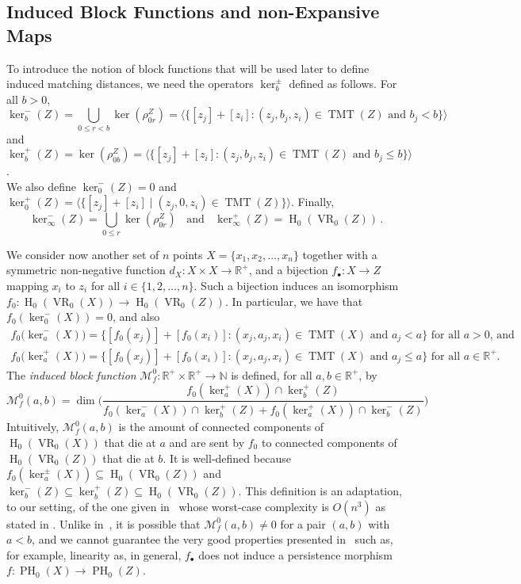 \documentclass{article}
\DeclareMathOperator{\PH}{PH}
\DeclareMathOperator{\VR}{VR}
\DeclareMathOperator{\Ho}{H}
\DeclareMathOperator{\TMT}{TMT}
\newcommand{\R}{\mathbb{R}^+}
\newcommand{\N}{\mathbb{N}}
\newcommand{\cM}{\mathcal{M}}
\newcommand{\scst}{\scriptscriptstyle}
\newcommand{\cMXZ}{\cM_f^0}
\newcommand{\dX}{d_{\scst X}}
\newcommand{\dZ}{d_{\scst Z}}
\newcommand{\fbullet}{f_{\bullet}}
\begin{document}
\subsection{Induced Block Functions
and non-Expansive Maps}\label{sec:non-expansive}

To introduce  the notion of block functions that will be used later to define induced matching distances, we need the 
 operators $\ker^\pm_{b}$  defined as follows. For all $b>0$,
\[\ker^-_b(Z
)= \bigcup_{0 \leq r < b} \ker(\rho^{\scst Z}_{0r})
=\big\langle
\big\{[z_j]+[z_i]\colon (z_j, b_j, z_i)\in \TMT(Z)\mbox{ and }
b_j<b\big\}\big\rangle\]
and $\ker^+_b(Z)
= \ker(\rho^{\scst Z}_{0b})
=\big\langle\big\{
[z_j]+[z_i]\colon (z_j, b_j, z_i)\in \TMT(Z)\mbox{ and }
b_j\leq b\big\}\big\rangle$.
\\
We also define 
$\ker_0^-(Z)=0$ and $
\ker_0^+(Z) =  \big\langle \big\{ 
[z_j] + [z_i]
\mid (z_j, 0, z_i)\in \TMT(Z) 
\big\} \big\rangle $. Finally,
\[
\ker^-_\infty(Z) = \bigcup_{0\leq r} 
\ker(\rho^{\scst Z}_{0r})
\;\;\mbox{ and }\;\;
\ker^+_\infty(Z) = \Ho_0(\VR_0(Z))\,.
\]





We consider now another set of $n$ points 
$X=\{x_1,x_2,\dots,x_n\}$ 
together with a symmetric non-negative function
 $\dX\colon X\times X\rightarrow \R$,
and a bijection $\fbullet\colon X\to Z$ mapping $x_i$ to $z_i$ for all $i\in\{1,2,\dots,n\}$.
Such a bijection induces an isomorphism $f_0\colon\Ho_0(\VR_0(X))\to \Ho_0(\VR_0(Z))$. 
In particular, 
we have that 
$f_0(\ker^-_0(X))=0$, and also
\begin{align*}
  f_0 \big(\ker^-_a(X)\big) = \big\{
[f_0(x_j)]+[f_0(x_i)]\colon (x_j, a_j, x_i)\in \TMT(X)\mbox{ and }
a_j< a
\big\} \mbox{ for all $a>0$, and}
\\
f_0 \big(\ker^+_a(X)\big) = \big\{
[f_0(x_j)]+[f_0(x_i)]\colon (x_j, a_j, x_i)\in \TMT(X)\mbox{ and }
a_j\leq a
\big\}  \mbox{ for all $a\in\R$}.
\end{align*}
The {\it induced block function} 
$\cMXZ\colon \R\times\R
\rightarrow \N$ is
defined, for all
$a,b \in \R$,   by
\begin{equation*}
\cMXZ(a,b) = 
\dim\bigg(
\dfrac{
f_0(\ker_{a}^+(X)) \cap \ker_{b}^+(Z)
}{
f_0(\ker_{a}^-(X)) \cap \ker_{b}^+(
Z) +f_0(\ker_{a}^+(X)) \cap \ker_{b}^-(Z)
}
\bigg)
\end{equation*}
Intuitively,
$\cMXZ(a,b)$ is the amount of connected components of $\Ho_0(\VR_0(X))$ that die at $a$ and are sent by $f_0$ to connected components of $\Ho_0(\VR_0(Z))$ that die at $b$.
It is well-defined because 
$f_0(\ker_{a}^{\pm}(X))\subseteq \Ho_0(\VR_0(Z))$ and 
$\ker_{b}^{-}(Z)\subseteq \ker_{b}^{+}(Z)\subseteq \Ho_0(\VR_0(Z))$.
This definition is an adaptation, to our setting,  of the one given  in~\cite{matchings} whose worst-case complexity is $O(n^3)$ as stated in \cite{tdqual}.
Unlike in~\cite{matchings}, it is possible that $\cMXZ(a,b)\neq 0$ for 
a pair $(a,b)$ with $a<b$,
and we cannot guarantee the 
 very good properties presented in~\cite{matchings}  such as, for example, linearity
as, in general, $f_\bullet$ does not induce a persistence morphism $f\colon \PH_0(X)\rightarrow \PH_0(Z)$.
\end{document}
